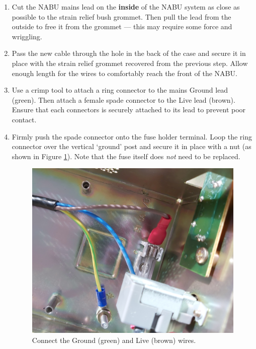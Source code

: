 \begin{enumerate}
	\item Cut the NABU mains lead on the \textbf{inside} of the NABU system as close as possible to the strain relief bush grommet. Then pull the lead from the outside to free it from the grommet --- this may require some force and wriggling.
	\item Pass the new cable through the hole in the back of the case and secure it in place with the strain relief grommet recovered from the previous step. Allow enough length for the wires to comfortably reach the front of the NABU.
	\item Use a crimp tool to attach a ring connector to the mains Ground lead (green). Then attach a female spade connector to the Live lead (brown). Ensure that each connectors is securely attached to its lead to prevent poor contact.
	\item Firmly push the spade connector onto the fuse holder terminal. Loop the ring connector over the vertical `ground' post and secure it in place with a nut (as shown in Figure \ref{fig:new}). Note that the fuse itself does \textit{not} need to be replaced.
	\begin{figure}[h!]
		\includegraphics[width=\columnwidth]{images/psu-image-2.jpg}
		\caption[Ground and Live wire connections.]{Connect the Ground (green) and Live (brown) wires.}
		\label{fig:new}
	\end{figure}
\end{enumerate}
